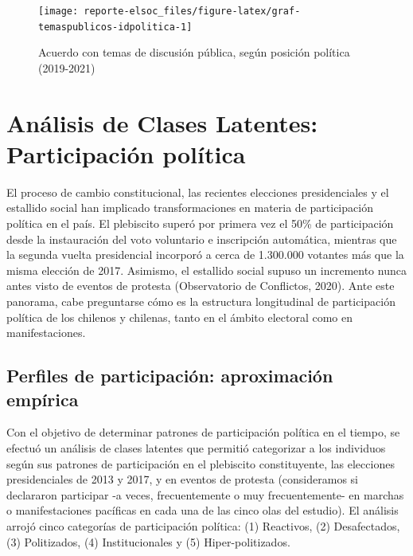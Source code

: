 \documentclass[
  12pt,
]{book}
\begin{document}
\begin{figure}

{\centering \texttt{[image: reporte-elsoc\_files/figure-latex/graf-temaspublicos-idpolitica-1]} 

}

\caption{Acuerdo con temas de discusión pública, según posición política (2019-2021)}\label{fig:graf-temaspublicos-idpolitica}
\end{figure}

\hypertarget{anuxe1lisis-de-clases-latentes-participaciuxf3n-poluxedtica}{%
\section{Análisis de Clases Latentes: Participación política}\label{anuxe1lisis-de-clases-latentes-participaciuxf3n-poluxedtica}}

El proceso de cambio constitucional, las recientes elecciones presidenciales y el estallido social han implicado transformaciones en materia de participación política en el país. El plebiscito superó por primera vez el 50\% de participación desde la instauración del voto voluntario e inscripción automática, mientras que la segunda vuelta presidencial incorporó a cerca de 1.300.000 votantes más que la misma elección de 2017. Asimismo, el estallido social supuso un incremento nunca antes visto de eventos de protesta (Observatorio de Conflictos, 2020). Ante este panorama, cabe preguntarse cómo es la estructura longitudinal de participación política de los chilenos y chilenas, tanto en el ámbito electoral como en manifestaciones.

\hypertarget{perfiles-de-participaciuxf3n-aproximaciuxf3n-empuxedrica}{%
\subsection*{Perfiles de participación: aproximación empírica}\label{perfiles-de-participaciuxf3n-aproximaciuxf3n-empuxedrica}}

Con el objetivo de determinar patrones de participación política en el tiempo, se efectuó un análisis de clases latentes que permitió categorizar a los individuos según sus patrones de participación en el plebiscito constituyente, las elecciones presidenciales de 2013 y 2017, y en eventos de protesta (consideramos si declararon participar -a veces, frecuentemente o muy frecuentemente- en marchas o manifestaciones pacíficas en cada una de las cinco olas del estudio). El análisis arrojó cinco categorías de participación política: (1) Reactivos, (2) Desafectados, (3) Politizados, (4) Institucionales y (5) Hiper-politizados.
\end{document}
